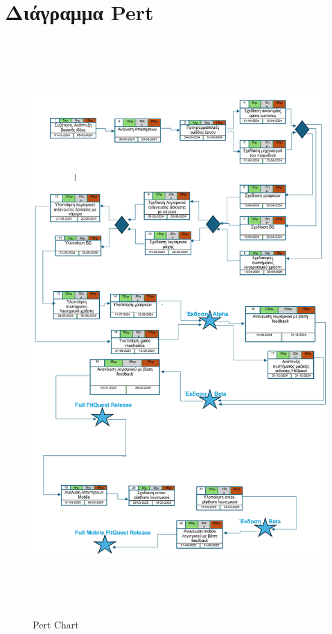 \section{Διάγραμμα Pert}
\begin{figure}[!htb]
  \centering
    \centering
    \includegraphics[width=\textwidth,height=22cm]{pertchart.jpg}
    \caption{Pert Chart}
    \label{}
\end{figure}
